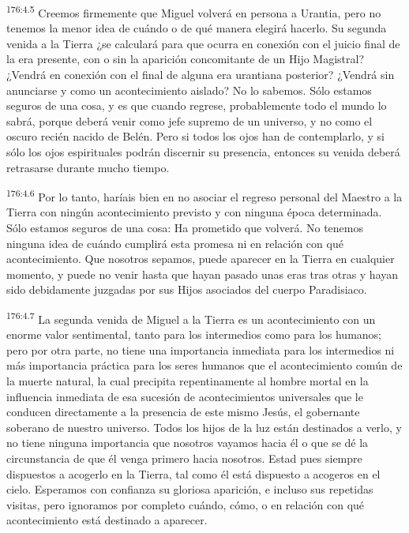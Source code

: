 \par 
\textsuperscript{176:4.5} Creemos firmemente que Miguel volverá en persona a Urantia, pero no tenemos la menor idea de cuándo o de qué manera elegirá hacerlo. Su segunda venida a la Tierra ¿se calculará para que ocurra en conexión con el juicio final de la era presente, con o sin la aparición concomitante de un Hijo Magistral? ¿Vendrá en conexión con el final de alguna era urantiana posterior? ¿Vendrá sin anunciarse y como un acontecimiento aislado? No lo sabemos. Sólo estamos seguros de una cosa, y es que cuando regrese, probablemente todo el mundo lo sabrá, porque deberá venir como jefe supremo de un universo, y no como el oscuro recién nacido de Belén. Pero si todos los ojos han de contemplarlo, y si sólo los ojos espirituales podrán discernir su presencia, entonces su venida deberá retrasarse durante mucho tiempo.

\par 
\textsuperscript{176:4.6} Por lo tanto, haríais bien en no asociar el regreso personal del Maestro a la Tierra con ningún acontecimiento previsto y con ninguna época determinada. Sólo estamos seguros de una cosa: Ha prometido que volverá. No tenemos ninguna idea de cuándo cumplirá esta promesa ni en relación con qué acontecimiento. Que nosotros sepamos, puede aparecer en la Tierra en cualquier momento, y puede no venir hasta que hayan pasado unas eras tras otras y hayan sido debidamente juzgadas por sus Hijos asociados del cuerpo Paradisiaco.

\par 
\textsuperscript{176:4.7} La segunda venida de Miguel a la Tierra es un acontecimiento con un enorme valor sentimental, tanto para los intermedios como para los humanos; pero por otra parte, no tiene una importancia inmediata para los intermedios ni más importancia práctica para los seres humanos que el acontecimiento común de la muerte natural, la cual precipita repentinamente al hombre mortal en la influencia inmediata de esa sucesión de acontecimientos universales que le conducen directamente a la presencia de este mismo Jesús, el gobernante soberano de nuestro universo. Todos los hijos de la luz están destinados a verlo, y no tiene ninguna importancia que nosotros vayamos hacia él o que se dé la circunstancia de que él venga primero hacia nosotros. Estad pues siempre dispuestos a acogerlo en la Tierra, tal como él está dispuesto a acogeros en el cielo. Esperamos con confianza su gloriosa aparición, e incluso sus repetidas visitas, pero ignoramos por completo cuándo, cómo, o en relación con qué acontecimiento está destinado a aparecer.